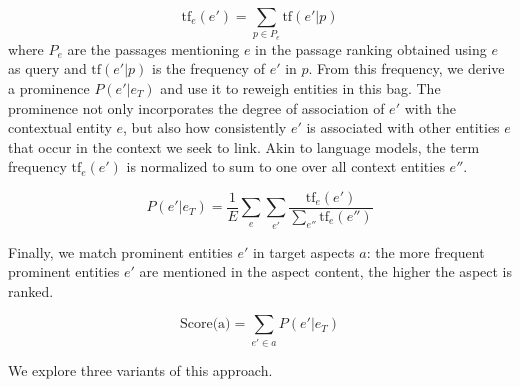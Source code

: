 \begin{equation}
\label{eq:frequency-of-co-occurring-ent}
    \text{tf}_{e}(e')=\sum_{p\in P_e}\text{tf}(e'\vert p)
\end{equation}
where $P_e$ are the passages mentioning $e$ in the passage ranking obtained using $e$ as query and $\text{tf}(e'\vert p)$ is the frequency of $e'$ in $p$.
%
From this frequency, we derive a prominence $P(e'\vert e_T)$ and use it to reweigh entities in this bag. The prominence not only incorporates the degree of association of $e'$ with the contextual entity $e$, but also how consistently $e'$ is associated with other entities $e$ that occur in the context we seek to link. Akin to language models, the term frequency $\text{tf}_{e}(e')$ is normalized to sum to one over all context entities $e''$.

    \begin{equation}
    \label{eq:prominence}
        P(e' \vert e_T) =  \frac{1}{E} \sum_e  \sum_{e'} \frac{\text{tf}_{e}(e')}{\sum_{e''}\text{tf}_{e}(e'')}
    \end{equation}



Finally, we match prominent entities $e'$ in target aspects $a$: the more frequent  prominent entities $e'$ are mentioned in the aspect content, the higher the aspect is ranked. 

    \begin{equation}
    \label{eq:score-aspect-using-simple-freq-dist}
        \text{Score(a)} = \sum_{e' \in a}P(e' \vert e_T)
    \end{equation}



We explore three variants of this approach.

